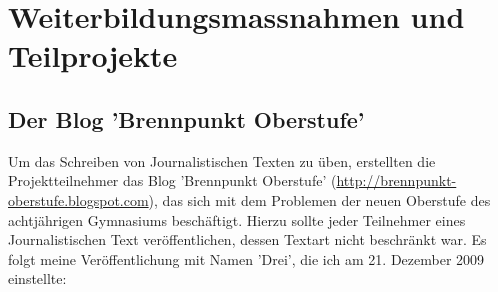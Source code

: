 \documentclass[a4paper,12pt,twoside]{scrbook}
\begin{document}
\section{Weiterbildungsmassnahmen und Teilprojekte}
\subsection{Der Blog 'Brennpunkt Oberstufe'}
Um das Schreiben von Journalistischen Texten zu üben, erstellten die Projektteilnehmer das Blog 'Brennpunkt Oberstufe' (\url{http://brennpunkt-oberstufe.blogspot.com}), das sich mit dem Problemen der neuen Oberstufe des achtjährigen Gymnasiums beschäftigt.
Hierzu sollte jeder Teilnehmer eines Journalistischen Text veröffentlichen, dessen Textart nicht beschränkt war.
Es folgt meine Veröffentlichung mit Namen 'Drei', die ich am 21. Dezember 2009 einstellte:
\end{document}
